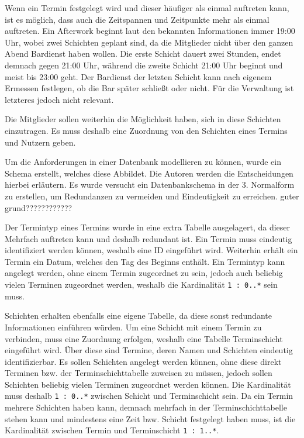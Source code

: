 Wenn ein Termin festgelegt wird und dieser häufiger als einmal auftreten kann, ist es möglich, dass auch die Zeitspannen und Zeitpunkte mehr als einmal auftreten. Ein Afterwork beginnt laut den bekannten Informationen immer 19:00 Uhr, wobei zwei Schichten geplant sind, da die Mitglieder nicht über den ganzen Abend Bardienst haben wollen. Die erste Schicht dauert zwei Stunden, endet demnach gegen 21:00 Uhr, während die zweite Schicht 21:00 Uhr beginnt und meist bis 23:00 geht. Der Bardienst der letzten Schicht kann nach eigenem Ermessen festlegen, ob die Bar später schließt oder nicht. Für die Verwaltung ist letzteres jedoch nicht relevant.

Die Mitglieder sollen weiterhin die Möglichkeit haben, sich in diese Schichten einzutragen. Es muss deshalb eine Zuordnung von den Schichten eines Termins und Nutzern geben. 


Um die Anforderungen in einer Datenbank modellieren zu können, wurde ein Schema erstellt, welches diese Abbildet. Die Autoren werden die Entscheidungen hierbei erläutern. Es wurde versucht ein Datenbankschema in der 3. Normalform zu erstellen, um Redundanzen zu vermeiden und Eindeutigkeit zu erreichen. guter grund????????????

Der Termintyp eines Termins wurde in eine extra Tabelle ausgelagert, da dieser Mehrfach auftreten kann und deshalb redundant ist. Ein Termin muss eindeutig identifiziert werden können, weshalb eine ID eingeführt wird. Weiterhin erhält ein Termin ein Datum, welches den Tag des Beginns enthält. Ein Termintyp kann angelegt werden, ohne einem Termin zugeordnet zu sein, jedoch auch beliebig vielen Terminen zugeordnet werden, weshalb die Kardinalität \texttt{1 : 0..*} sein muss.

Schichten erhalten ebenfalls eine eigene Tabelle, da diese sonst redundante Informationen einführen würden. Um eine Schicht mit einem Termin zu verbinden, muss eine Zuordnung erfolgen, weshalb eine Tabelle Terminschicht eingeführt wird. Über diese sind Termine, deren Namen und Schichten eindeutig identifizierbar. Es sollen Schichten angelegt werden können, ohne diese direkt Terminen bzw. der Terminschichttabelle zuweisen zu müssen, jedoch sollen Schichten beliebig vielen Terminen zugeordnet werden können. Die Kardinalität muss deshalb \texttt{1 : 0..*} zwischen Schicht und Terminschicht sein. Da ein Termin mehrere Schichten haben kann, demnach mehrfach in der Terminschichttabelle stehen kann und mindestens eine Zeit bzw. Schicht festgelegt haben muss, ist die Kardinalität zwischen Termin und Terminschicht \texttt{1 : 1..*}.

